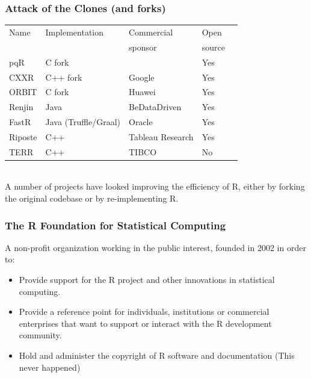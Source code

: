 \documentclass[svgnames]{beamer}
\begin{document}
\begin{frame}
  \frametitle{Attack of the Clones (and forks)}

  \begin{center}
  \begin{tabular}{llllc}
    \hline
    Name & Implementation & Commercial & Open \\
         &                & sponsor    & source \\
    \hline
    pqR     & C fork   &   & Yes \\
    CXXR    & C++ fork & Google & Yes \\
    ORBIT   & C fork   & Huawei & Yes \\
    \hline
    Renjin  & Java     & BeDataDriven & Yes \\
    FastR   & Java (Truffle/Graal) & Oracle & Yes \\
    Riposte & C++      & Tableau Research & Yes\\
    TERR    & C++      & TIBCO & No \\
    \hline
  \end{tabular}

  ~\\
  
  {\small A number of projects have looked improving the efficiency of
    R, either by forking the original codebase or by re-implementing
    R.}
  
  \end{center}
  
\end{frame}

\begin{frame}
  \frametitle{The R Foundation for Statistical Computing}

  A non-profit organization working in the public interest, founded
  in 2002 in order to:
  \begin{itemize}
  \item Provide support for the R project and other innovations in
    statistical computing.
  \item Provide a reference point for individuals, institutions or
    commercial enterprises that want to support or interact with the R
    development community.
  \item Hold and administer the copyright of R software and
    documentation (This never happened)
  \end{itemize}
  
\end{frame}
    
\end{document}
